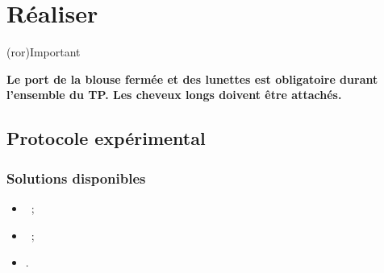 \documentclass[../main/main.tex]{subfiles}
\begin{document}
\section{Réaliser}

\begin{tcb}(ror){Important}
	\begin{center}
		\bfseries
		Le port de la blouse fermée et des lunettes est obligatoire durant
		l'ensemble du TP. Les cheveux longs doivent être attachés.
	\end{center}
\end{tcb}

\subsection{Protocole expérimental}

\subsubsection{Solutions disponibles}
\begin{itemize}
	\item {}~;
	      \vspace{-15pt}
	\item {}~;
	      \vspace{-15pt}
	\item {}.
\end{itemize}
\end{document}
